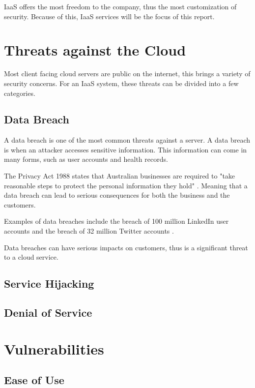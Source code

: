 IaaS offers the most freedom to the company, thus the most customization of security. Because of this, IaaS services will be the focus of this report.

\section{Threats against the Cloud}

Most client facing cloud servers are public on the internet, this brings a variety of security concerns. For an IaaS system, these threats can be divided into a few categories.

\subsection{Data Breach}

A data breach is one of the most common threats against a server. A data breach is when an attacker accesses sensitive information. This information can come in many forms, such as user accounts and health records. 

The Privacy Act 1988 states that Australian businesses are required to "take reasonable steps to protect the personal information they hold" \cite{office_of_the_australia_information_commissioner_rights_2016}. Meaning that a data breach can lead to serious consequences for both the business and the customers.

Examples of data breaches include the breach of 100 million LinkedIn user accounts \cite{linkedin_update_2012} and the breach of 32 million Twitter accounts \cite{leakedsource_leakedsource_2016}.

Data breaches can have serious impacts on customers, thus is a significant threat to a cloud service.

\subsection{Service Hijacking}


\subsection{Denial of Service}


\section{Vulnerabilities}

\subsection{Ease of Use}

